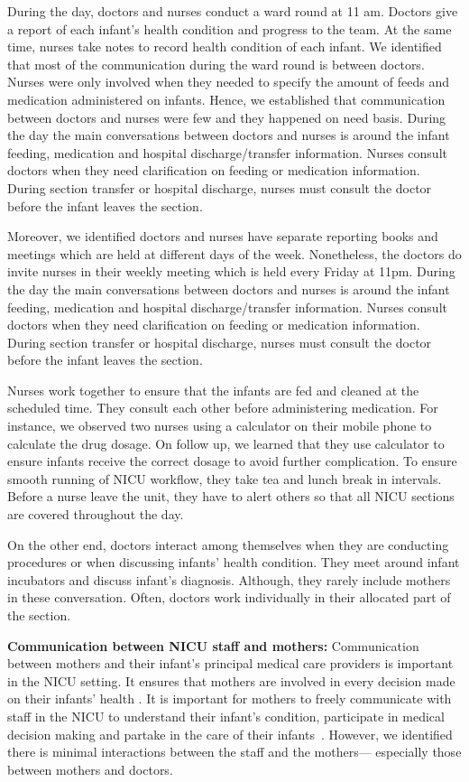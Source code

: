 During the day, doctors and nurses conduct a ward round at 11 am. Doctors give a report of each infant’s health condition and progress to the team. At the same time, nurses take notes to record health condition of each infant. We identified that most of the communication during the ward round is between doctors. Nurses were only involved when they needed to specify the amount of feeds and medication administered on infants. Hence, we established that communication between doctors and nurses were few and they happened on need basis. During the day the main conversations between doctors and nurses is around the infant feeding, medication and hospital discharge/transfer information. Nurses consult doctors when they need clarification on feeding or medication information. During section transfer or hospital discharge, nurses must consult the doctor before the infant leaves the section.

Moreover, we identified doctors and nurses have separate reporting books and meetings which are held at different days of the week. Nonetheless, the doctors do invite nurses in their weekly meeting which is held every Friday at 11pm. During the day the main conversations between doctors and nurses is around the infant feeding, medication and hospital discharge/transfer information. Nurses consult doctors when they need clarification on feeding or medication information. During section transfer or hospital discharge, nurses must consult the doctor before the infant leaves the section. 

Nurses work together to ensure that the infants are fed and cleaned at the scheduled time. They consult each other before administering medication. For instance, we observed two nurses using a calculator on their mobile phone to calculate the drug dosage. On follow up, we learned that they use calculator to ensure infants receive the correct dosage to avoid further complication. To ensure smooth running of NICU workflow, they take tea and lunch break in intervals. Before a nurse leave the unit, they have to alert others so that all NICU sections are covered throughout the day.

On the other end, doctors interact among themselves when they are conducting procedures or when discussing infants’ health condition. They meet around infant incubators and discuss infant’s diagnosis. Although, they rarely include mothers in these conversation. Often, doctors work individually in their allocated part of the section.

\textbf{Communication between NICU staff and mothers:}
Communication between mothers and their infant’s principal medical care providers is important in the NICU setting. It ensures that mothers are involved in every decision made on their infants’ health \citep{Orzalesi2011, HadianShirazi2015}. It is important for mothers to freely communicate with staff in the NICU to understand their infant’s condition, participate in medical decision making and  partake in the care of their infants~\citep{Wigert2014b}. However, we identified there is minimal interactions between the staff and the mothers--- especially those between mothers and doctors. 

